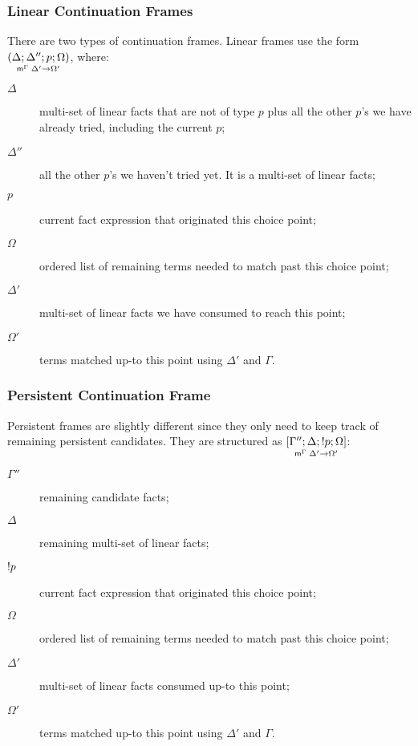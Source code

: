 \subsubsection{Linear Continuation Frames}

There are two types of continuation frames. Linear frames use the form
$\lframe{\Delta}{\Delta''}{p}{\Omega}{\Delta'}{\Omega'}$, where:

\begin{description}
   \item[$\Delta$] multi-set of linear facts that are not of type $p$ plus all
   the other $p$'s we have already tried, including the current $p$;

   \item[$\Delta''$] all the other $p$'s we haven't tried yet. It is a multi-set
   of linear facts;

   \item[$p$] current fact expression that originated this choice point;

   \item[$\Omega$] ordered list of remaining terms needed to match past this
   choice point;

   \item[$\Delta'$] multi-set of linear facts we have consumed to reach this point;

   \item[$\Omega'$] terms matched up-to this point using $\Delta'$ and $\Gamma$.
\end{description}

\subsubsection{Persistent Continuation Frame}

Persistent frames are slightly different since they only need to keep track of
remaining persistent candidates. They are structured as $\pframe{\Gamma''}{\Delta}{\bang
   p}{\Omega}{\Delta'}{\Omega'}$:

\begin{description}
   \item[$\Gamma''$] remaining candidate facts;
   \item[$\Delta$] remaining multi-set of linear facts;
   \item[$\bang p$] current fact expression that originated this choice point;
   \item[$\Omega$] ordered list of remaining terms needed to match past this
   choice point;
   \item[$\Delta'$] multi-set of linear facts consumed up-to this point;
   \item[$\Omega'$] terms matched up-to this point using $\Delta'$ and $\Gamma$.
\end{description}



